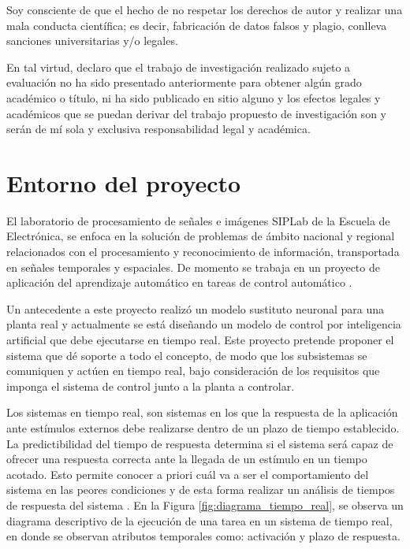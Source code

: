 \documentclass[12pt]{article}
\begin{document}
Soy consciente de que el hecho de no respetar los derechos de autor y realizar una mala conducta científica; es decir, fabricación de datos falsos y plagio, conlleva
sanciones universitarias y/o legales.

En tal virtud, declaro que el trabajo de investigación realizado sujeto a evaluación no ha sido presentado anteriormente para obtener algún grado académico o título, ni ha sido publicado en sitio alguno y los efectos legales y académicos que se puedan derivar del trabajo propuesto de investigación son y serán de mí sola y exclusiva responsabilidad legal y académica.

\newpage
\tableofcontents

\newpage

\section{Entorno del proyecto}

El laboratorio de procesamiento de señales e imágenes SIPLab de la Escuela de Electrónica, se enfoca en la solución de problemas de ámbito nacional y regional relacionados con el procesamiento y reconocimiento de información, transportada en señales temporales y espaciales. De momento se trabaja en un proyecto de aplicación del aprendizaje automático en tareas de control automático  \cite{SIPLab} \cite{13_se}.

Un antecedente a este proyecto realizó un modelo sustituto neuronal para una planta real y actualmente se está diseñando un modelo de control por inteligencia artificial que debe ejecutarse en tiempo real. Este proyecto pretende proponer el sistema que dé soporte a todo el concepto, de modo que los subsistemas se comuniquen y actúen en tiempo real, bajo consideración de los requisitos que imponga el sistema de control junto a la planta a controlar. 

Los sistemas en tiempo real, son sistemas en los que la respuesta de la aplicación ante estímulos externos debe realizarse dentro de un plazo de tiempo establecido. La predictibilidad del tiempo de respuesta determina si el sistema será capaz de ofrecer una respuesta correcta ante la llegada de un estímulo en un tiempo acotado. Esto permite conocer a priori cuál va a ser el comportamiento del sistema en las peores condiciones y de esta forma realizar un análisis de tiempos de respuesta del sistema \cite{alonso2010panoramica}. En la Figura \ref{fig:diagrama_tiempo_real}, se observa un diagrama descriptivo de la ejecución de una tarea en un sistema de tiempo real, en donde se observan atributos temporales como: activación y plazo de respuesta\cite{de2000introduccion}.
\end{document}
